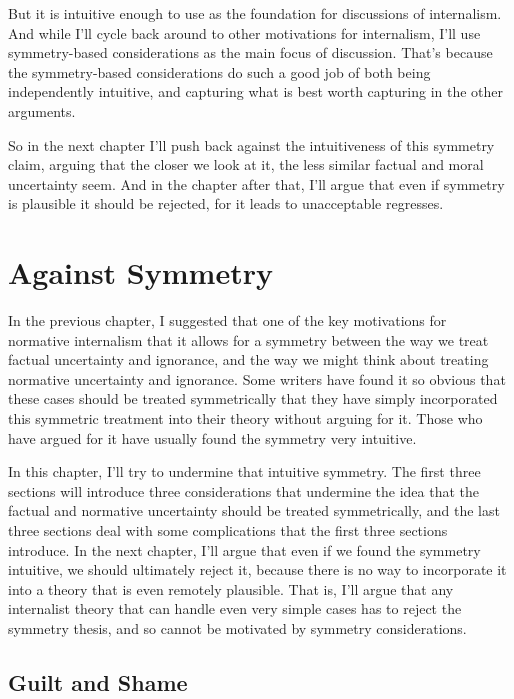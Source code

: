 \documentclass[
  10pt,
  letterpaper,
  twoside]{scrbook}
\begin{document}
But it is intuitive enough to use as the foundation for discussions of
internalism. And while I'll cycle back around to other motivations for
internalism, I'll use symmetry-based considerations as the main focus of
discussion. That's because the symmetry-based considerations do such a
good job of both being independently intuitive, and capturing what is
best worth capturing in the other arguments.

So in the next chapter I'll push back against the intuitiveness of this
symmetry claim, arguing that the closer we look at it, the less similar
factual and moral uncertainty seem. And in the chapter after that, I'll
argue that even if symmetry is plausible it should be rejected, for it
leads to unacceptable regresses.

\chapter{Against Symmetry}\label{againstsymmetry}

In the previous chapter, I suggested that one of the key motivations for
normative internalism that it allows for a symmetry between the way we
treat factual uncertainty and ignorance, and the way we might think
about treating normative uncertainty and ignorance. Some writers have
found it so obvious that these cases should be treated symmetrically
that they have simply incorporated this symmetric treatment into their
theory without arguing for it. Those who have argued for it have usually
found the symmetry very intuitive.

In this chapter, I'll try to undermine that intuitive symmetry. The
first three sections will introduce three considerations that undermine
the idea that the factual and normative uncertainty should be treated
symmetrically, and the last three sections deal with some complications
that the first three sections introduce. In the next chapter, I'll argue
that even if we found the symmetry intuitive, we should ultimately
reject it, because there is no way to incorporate it into a theory that
is even remotely plausible. That is, I'll argue that any internalist
theory that can handle even very simple cases has to reject the symmetry
thesis, and so cannot be motivated by symmetry considerations.

\section{Guilt and Shame}\label{guiltandshame}
\end{document}
